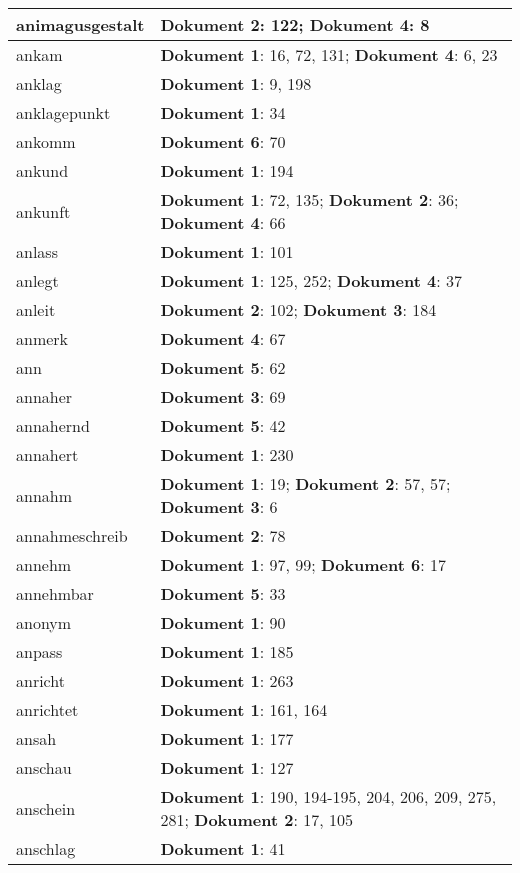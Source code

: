 \documentclass[a5paper]{article}
\begin{document}
\begin{longtable}[l]{|l|p{3in}|}
\hline
animagusgestalt & \textbf{Dokument 2}: 122; \textbf{Dokument 4}: 8 \\
\hline
ankam & \textbf{Dokument 1}: 16, 72, 131; \textbf{Dokument 4}: 6, 23 \\
\hline
anklag & \textbf{Dokument 1}: 9, 198 \\
\hline
anklagepunkt & \textbf{Dokument 1}: 34 \\
\hline
ankomm & \textbf{Dokument 6}: 70 \\
\hline
ankund & \textbf{Dokument 1}: 194 \\
\hline
ankunft & \textbf{Dokument 1}: 72, 135; \textbf{Dokument 2}: 36; \textbf{Dokument 4}: 66 \\
\hline
anlass & \textbf{Dokument 1}: 101 \\
\hline
anlegt & \textbf{Dokument 1}: 125, 252; \textbf{Dokument 4}: 37 \\
\hline
anleit & \textbf{Dokument 2}: 102; \textbf{Dokument 3}: 184 \\
\hline
anmerk & \textbf{Dokument 4}: 67 \\
\hline
ann & \textbf{Dokument 5}: 62 \\
\hline
annaher & \textbf{Dokument 3}: 69 \\
\hline
annahernd & \textbf{Dokument 5}: 42 \\
\hline
annahert & \textbf{Dokument 1}: 230 \\
\hline
annahm & \textbf{Dokument 1}: 19; \textbf{Dokument 2}: 57, 57; \textbf{Dokument 3}: 6 \\
\hline
annahmeschreib & \textbf{Dokument 2}: 78 \\
\hline
annehm & \textbf{Dokument 1}: 97, 99; \textbf{Dokument 6}: 17 \\
\hline
annehmbar & \textbf{Dokument 5}: 33 \\
\hline
anonym & \textbf{Dokument 1}: 90 \\
\hline
anpass & \textbf{Dokument 1}: 185 \\
\hline
anricht & \textbf{Dokument 1}: 263 \\
\hline
anrichtet & \textbf{Dokument 1}: 161, 164 \\
\hline
ansah & \textbf{Dokument 1}: 177 \\
\hline
anschau & \textbf{Dokument 1}: 127 \\
\hline
anschein & \textbf{Dokument 1}: 190, 194-195, 204, 206, 209, 275, 281; \textbf{Dokument 2}: 17, 105 \\
\hline
anschlag & \textbf{Dokument 1}: 41 \\

\end{longtable}
\end{document}
